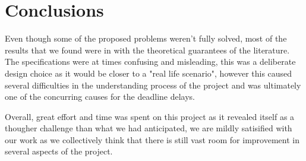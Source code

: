 \chapter{Conclusions}
\label{chap:conclusions}

Even though some of the proposed problems weren't fully solved, most of the results that we found were in with the theoretical guarantees of the literature.
The specifications were at times confusing and misleading, this was a deliberate design choice as it would be closer to a "real life scenario", however this caused several difficulties in the understanding process of the project and was ultimately one of the concurring causes for the deadline delays.

Overall, great effort and time was spent on this project as it revealed itself as a thougher challenge than what we had anticipated, we are mildly satisified with our work as we collectively think that there is still vast room for improvement in several aspects of the project.
